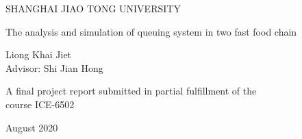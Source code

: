 \begin{center}
    {\large SHANGHAI JIAO TONG UNIVERSITY}
\end{center}
\vspace{6cm}

\begin{center}

    \Huge The analysis and simulation of queuing system in two fast food chain\\
    \vspace{.5cm}


\end{center}
\vspace{2.5cm}
\begin{center}
    \Large Liong Khai Jiet\\Advisor: Shi Jian Hong
\end{center}

\vspace{8cm}
\begin{center}
    {\large A final project report submitted in partial fulfillment of the \\course ICE-6502 }
\end{center}

\begin{center}
    {\large August 2020}
\end{center}